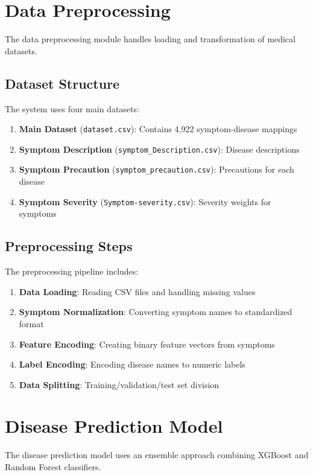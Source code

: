 \section{Data Preprocessing}
The data preprocessing module handles loading and transformation of medical datasets.

\subsection{Dataset Structure}
The system uses four main datasets:

\begin{enumerate}
    \item \textbf{Main Dataset} (\texttt{dataset.csv}): Contains 4,922 symptom-disease mappings
    \item \textbf{Symptom Description} (\texttt{symptom\_Description.csv}): Disease descriptions
    \item \textbf{Symptom Precaution} (\texttt{symptom\_precaution.csv}): Precautions for each disease
    \item \textbf{Symptom Severity} (\texttt{Symptom-severity.csv}): Severity weights for symptoms
\end{enumerate}

\subsection{Preprocessing Steps}
The preprocessing pipeline includes:

\begin{enumerate}
    \item \textbf{Data Loading}: Reading CSV files and handling missing values
    \item \textbf{Symptom Normalization}: Converting symptom names to standardized format
    \item \textbf{Feature Encoding}: Creating binary feature vectors from symptoms
    \item \textbf{Label Encoding}: Encoding disease names to numeric labels
    \item \textbf{Data Splitting}: Training/validation/test set division
\end{enumerate}

\section{Disease Prediction Model}
The disease prediction model uses an ensemble approach combining XGBoost and Random Forest classifiers.

